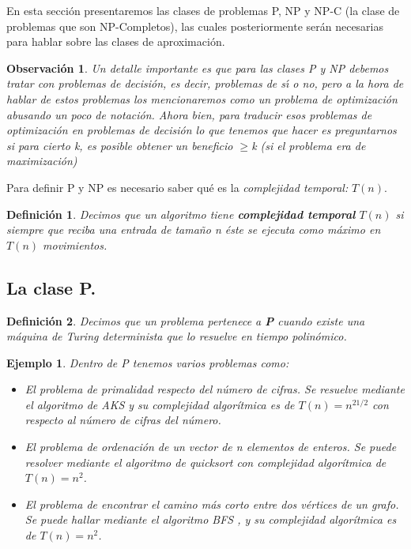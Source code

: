 \documentclass[a4paper,12pt,titlepage]{article}
\newtheorem{defi}{Definici\'on}[section]
\newtheorem{eje}{Ejemplo}[section]
\newtheorem{obs}{Observaci\'on}[section]
\begin{document}
En esta secci\'on presentaremos las clases de problemas P, NP y NP-C (la clase de problemas que son NP-Completos), las cuales posteriormente ser\'an necesarias para hablar sobre las clases de aproximaci\'on.

\begin{obs}

Un detalle importante es que para las clases P y NP debemos tratar con problemas de decisi\'on, es decir, problemas de s{\'\i} o no, pero a la hora de hablar de estos problemas los mencionaremos como un problema de optimizaci\'on abusando un poco de notaci\'on. Ahora bien, para traducir esos problemas de optimizaci\'on en problemas de decisi\'on lo que tenemos que hacer es preguntarnos si para cierto k, es posible obtener un beneficio $\geq$k (si el problema era de maximizaci\'on)

\end{obs}

Para definir P y NP es necesario saber qu\'e es la \textsl{complejidad temporal:} $T(n)$.

\begin{defi}

Decimos que un algoritmo tiene \textbf{complejidad temporal}
$T(n)$ si siempre que reciba una entrada de tamaño n \'este se
ejecuta como m\'aximo en $T(n)$ movimientos.

\end{defi}

\subsection{La clase P.}

\begin{defi}

Decimos que un problema pertenece a \textbf{P} cuando existe una m\'aquina de Turing determinista que lo resuelve en tiempo polin\'omico.

\end{defi}

\begin{eje}

Dentro de P tenemos varios problemas como:

\begin{itemize}
  \item El problema de primalidad respecto del n\'umero de cifras. Se resuelve mediante el algoritmo de AKS y su complejidad algor\'itmica es de $T(n) = n^{21/2}$ \cite{aks_complexity} con respecto al n\'umero de cifras del n\'umero.
  \item El problema de ordenaci\'on de un vector de n elementos de enteros. Se puede resolver mediante el algoritmo de quicksort \cite{quicksort} con complejidad algor\'itmica de $T(n) = n^{2}$.
  \item El problema de encontrar el camino m\'as corto entre dos v\'ertices de un grafo. Se puede hallar mediante el algoritmo BFS \cite{BFS}, y su complejidad algor\'itmica es de $T(n) = n^{2}$.
\end{itemize}

\end{eje}
\end{document}
